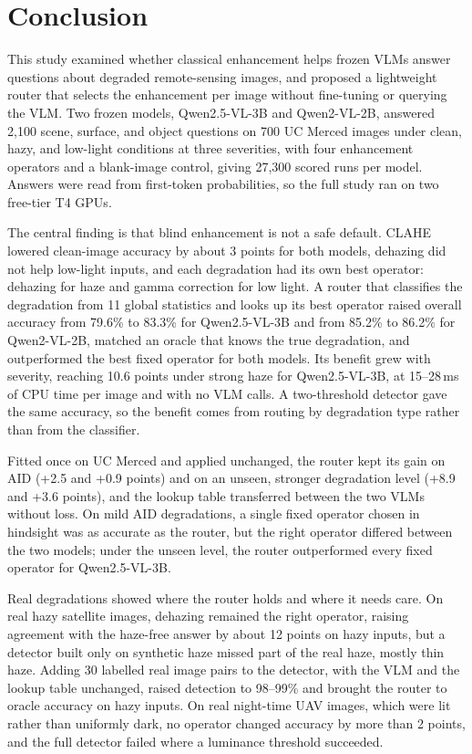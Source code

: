 \documentclass[lettersize,journal]{IEEEtran}
\begin{document}
\section{Conclusion}

This study examined whether classical enhancement helps frozen VLMs answer questions about degraded remote-sensing images, and proposed a lightweight router that selects the enhancement per image without fine-tuning or querying the VLM. Two frozen models, Qwen2.5-VL-3B and Qwen2-VL-2B, answered 2,100 scene, surface, and object questions on 700 UC Merced images under clean, hazy, and low-light conditions at three severities, with four enhancement operators and a blank-image control, giving 27,300 scored runs per model. Answers were read from first-token probabilities, so the full study ran on two free-tier T4 GPUs.

The central finding is that blind enhancement is not a safe default. CLAHE lowered clean-image accuracy by about 3 points for both models, dehazing did not help low-light inputs, and each degradation had its own best operator: dehazing for haze and gamma correction for low light. A router that classifies the degradation from 11 global statistics and looks up its best operator raised overall accuracy from 79.6\% to 83.3\% for Qwen2.5-VL-3B and from 85.2\% to 86.2\% for Qwen2-VL-2B, matched an oracle that knows the true degradation, and outperformed the best fixed operator for both models. Its benefit grew with severity, reaching 10.6 points under strong haze for Qwen2.5-VL-3B, at 15--28\,ms of CPU time per image and with no VLM calls. A two-threshold detector gave the same accuracy, so the benefit comes from routing by degradation type rather than from the classifier.

Fitted once on UC Merced and applied unchanged, the router kept its gain on AID (+2.5 and +0.9 points) and on an unseen, stronger degradation level (+8.9 and +3.6 points), and the lookup table transferred between the two VLMs without loss. On mild AID degradations, a single fixed operator chosen in hindsight was as accurate as the router, but the right operator differed between the two models; under the unseen level, the router outperformed every fixed operator for Qwen2.5-VL-3B.

Real degradations showed where the router holds and where it needs care. On real hazy satellite images, dehazing remained the right operator, raising agreement with the haze-free answer by about 12 points on hazy inputs, but a detector built only on synthetic haze missed part of the real haze, mostly thin haze. Adding 30 labelled real image pairs to the detector, with the VLM and the lookup table unchanged, raised detection to 98--99\% and brought the router to oracle accuracy on hazy inputs. On real night-time UAV images, which were lit rather than uniformly dark, no operator changed accuracy by more than 2 points, and the full detector failed where a luminance threshold succeeded.
\end{document}
